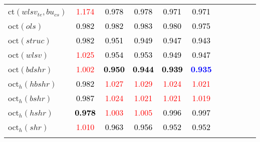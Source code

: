 \begin{tabular}[t]{l|>{}cccc>{}c|ccccc}
ct$(wlsv_{te}, bu_{cs})$ & \textcolor{red}{1.174} & \textcolor{black}{0.978} & \textcolor{black}{0.978} & \textcolor{black}{0.971} & \textcolor{black}{0.971} &  &  &  &  & \\
oct$(ols)$ & \textcolor{black}{0.982} & \textcolor{black}{0.982} & \textcolor{black}{0.983} & \textcolor{black}{0.980} & \textcolor{black}{0.975} &  &  &  &  & \\
oct$(struc)$ & \textcolor{black}{0.982} & \textcolor{black}{0.951} & \textcolor{black}{0.949} & \textcolor{black}{0.947} & \textcolor{black}{0.943} &  &  &  &  & \\
oct$(wlsv)$ & \textcolor{red}{1.025} & \textcolor{black}{0.954} & \textcolor{black}{0.953} & \textcolor{black}{0.949} & \textcolor{black}{0.947} &  &  &  &  & \\
oct$(bdshr)$ & \textcolor{red}{1.002} & \textcolor{black}{\textbf{0.950}} & \textcolor{black}{\textbf{0.944}} & \textcolor{black}{\textbf{0.939}} & \textcolor{blue}{\textbf{0.935}} &  &  &  &  & \\
oct$_h(hbshr)$ & \textcolor{black}{0.982} & \textcolor{red}{1.027} & \textcolor{red}{1.029} & \textcolor{red}{1.024} & \textcolor{red}{1.021} &  &  &  &  & \\
oct$_h(bshr)$ & \textcolor{black}{0.987} & \textcolor{red}{1.024} & \textcolor{red}{1.021} & \textcolor{red}{1.021} & \textcolor{red}{1.019} &  &  &  &  & \\
oct$_h(hshr)$ & \textcolor{black}{\textbf{0.978}} & \textcolor{red}{1.003} & \textcolor{red}{1.005} & \textcolor{black}{0.996} & \textcolor{black}{0.997} &  &  &  &  & \\
oct$_h(shr)$ & \textcolor{red}{1.010} & \textcolor{black}{0.963} & \textcolor{black}{0.956} & \textcolor{black}{0.952} & \textcolor{black}{0.952} &  &  &  &  & \\
\bottomrule
{}\\
\end{tabular}
